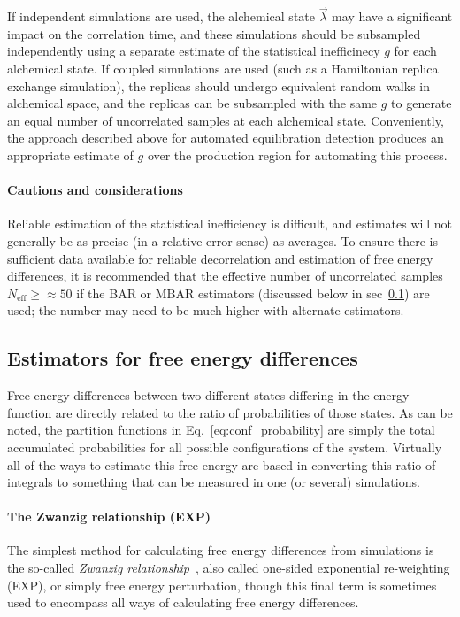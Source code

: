 \documentclass[9pt,bestpractices]{livecoms}
\begin{document}
If independent simulations are used, the alchemical state $\vec{\lambda}$ may have a significant impact on the correlation time, and these simulations should be subsampled independently using a separate estimate of the statistical inefficinecy $g$ for each alchemical state.
If coupled simulations are used (such as a Hamiltonian replica exchange simulation), the replicas should undergo equivalent random walks in alchemical space, and the replicas can be subsampled with the same $g$ to generate an equal number of uncorrelated samples at each alchemical state.
Conveniently, the approach described above for automated equilibration detection produces an appropriate estimate of $g$ over the production region for automating this process.

\paragraph{Cautions and considerations}
Reliable estimation of the statistical inefficiency is difficult, and estimates will not generally be as precise (in a relative error sense) as averages.
To ensure there is sufficient data available for reliable decorrelation and estimation of free energy differences, it is recommended that the effective number of uncorrelated samples $N_{\mathrm{eff}} \ge \approx 50$ if the BAR or MBAR estimators (discussed below in sec~\ref{subsec:estimators}) are used; the number may need to be much higher with alternate estimators.

\subsection{Estimators for free energy differences}
\label{subsec:estimators}
Free energy differences between two different states differing in the energy function are directly related to the
ratio of probabilities of those states.
As can be noted, the partition functions in Eq.~\ref{eq:conf_probability} are simply the total accumulated probabilities for all possible configurations of the system. Virtually all of the ways to estimate this free energy are based in converting this ratio of integrals to something that can be measured in one (or several) simulations.  

\paragraph{The Zwanzig relationship (EXP)}
The simplest method for calculating free energy differences from simulations is the so-called \textit{Zwanzig
relationship}~\cite{zwanzig1954hightemperature}, also called one-sided exponential re-weighting (EXP), or simply free energy perturbation, though this final term is sometimes used to encompass all ways of calculating free energy differences.
\end{document}
